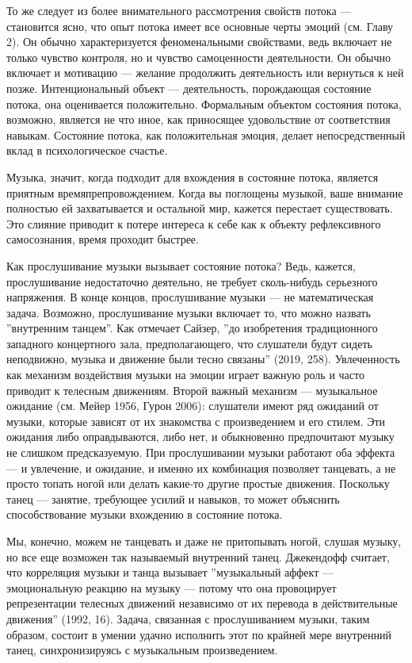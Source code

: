 \documentclass[11pt]{book}
\begin{document}
То же следует из более внимательного рассмотрения свойств потока --- становится ясно, что опыт потока имеет все основные черты эмоций (см. Главу 2). Он обычно характеризуется феноменальными свойствами, ведь включает не только чувство контроля, но и чувство самоценности деятельности. Он обычно включает и мотивацию --- желание продолжить деятельность или вернуться к ней позже. Интенциональный объект --- деятельность, порождающая состояние потока, она оценивается положительно. Формальным объектом состояния потока, возможно, является не что иное, как приносящее удовольствие от соответствия навыкам. Состояние потока, как положительная эмоция, делает непосредственный вклад в психологическое счастье.

Музыка, значит, когда подходит для вхождения в состояние потока, является приятным времяпрепровождением. Когда вы поглощены музыкой, ваше внимание полностью ей захватывается и остальной мир, кажется перестает существовать. Это слияние приводит к потере интереса к себе как к объекту рефлексивного самосознания, время проходит быстрее.

Как прослушивание музыки вызывает состояние потока? Ведь, кажется, прослушивание недостаточно деятельно, не требует сколь-нибудь серьезного напряжения. В конце концов, прослушивание музыки --- не математическая задача. Возможно, прослушивание музыки включает то, что можно назвать ''внутренним танцем''. Как отмечает Сайзер, ''до изобретения традиционного западного концертного зала, предполагающего, что слушатели будут сидеть неподвижно, музыка и движение были тесно связаны'' (2019, 258). Увлеченность как механизм воздействия музыки на эмоции играет важную роль и часто приводит к телесным движениям. Второй важный механизм --- музыкальное ожидание (см. Мейер 1956, Гурон 2006): слушатели имеют ряд ожиданий от музыки, которые зависят от их знакомства с произведением и его стилем. Эти ожидания либо оправдываются, либо нет, и обыкновенно предпочитают музыку не слишком предсказуемую. При прослушивании музыки работают оба эффекта --- и увлечение, и ожидание, и именно их комбинация позволяет танцевать, а не просто топать ногой или делать какие-то другие простые движения. Поскольку танец --- занятие, требующее усилий и навыков, то может объяснить способствование музыки вхождению в состояние потока.

Мы, конечно, можем не танцевать и даже не притопывать ногой, слушая музыку, но все еще возможен так называемый внутренний танец. Джекендофф считает, что корреляция музыки и танца вызывает ''музыкальный аффект --- эмоциональную реакцию на музыку --- потому что она провоцирует репрезентации телесных движений независимо от их перевода в действительные движения'' (1992, 16). Задача, связанная с прослушиванием музыки, таким образом, состоит в умении удачно исполнить этот по крайней мере внутренний танец, синхронизируясь с музыкальным произведением.
\end{document}
